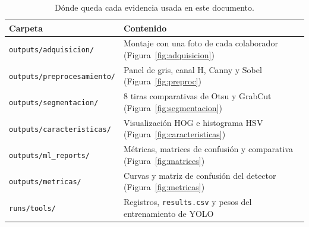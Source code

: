 \documentclass[11pt,a4paper]{article}
\begin{document}
\begin{table}[htbp]
\centering
\caption{Dónde queda cada evidencia usada en este documento.}
\label{tab:evidencia}
\small
\begin{tabularx}{\textwidth}{@{}l X@{}}
\toprule
\textbf{Carpeta} & \textbf{Contenido} \\
\midrule
\texttt{outputs/adquisicion/}      & Montaje con una foto de cada colaborador (Figura~\ref{fig:adquisicion}) \\
\texttt{outputs/preprocesamiento/} & Panel de gris, canal H, Canny y Sobel (Figura~\ref{fig:preproc}) \\
\texttt{outputs/segmentacion/}     & 8 tiras comparativas de Otsu y GrabCut (Figura~\ref{fig:segmentacion}) \\
\texttt{outputs/caracteristicas/}  & Visualización HOG e histograma HSV (Figura~\ref{fig:caracteristicas}) \\
\texttt{outputs/ml\_reports/}      & Métricas, matrices de confusión y comparativa (Figura~\ref{fig:matrices}) \\
\texttt{outputs/metricas/}         & Curvas y matriz de confusión del detector (Figura~\ref{fig:metricas}) \\
\texttt{runs/tools/}               & Registros, \texttt{results.csv} y pesos del entrenamiento de YOLO \\
\bottomrule
\end{tabularx}
\end{table}
\end{document}
